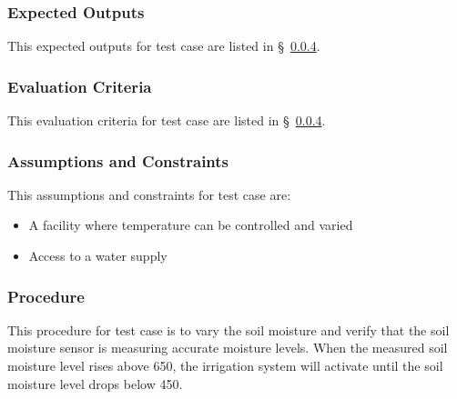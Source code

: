 \subsubsection{Expected Outputs}
\label{loc:TestCaseExpectedOutputs\StsTestSpecID\StsTestCaseID}
% 

This expected outputs for test  case  are listed in \S~\ref{loc:TestCaseProcedure\StsTestSpecID\StsTestCaseID}.

\subsubsection{Evaluation Criteria}
\label{loc:TestCaseEvaluationCriteria\StsTestSpecID\StsTestCaseID}
% 

This evaluation criteria for test  case  are listed in \S~\ref{loc:TestCaseProcedure\StsTestSpecID\StsTestCaseID}.

\subsubsection{Assumptions and Constraints}
\label{loc:TestCaseAssumptions\StsTestSpecID\StsTestCaseID}
% 

This assumptions and constraints for test  case  are:

\begin{itemize}
    \item A facility where temperature can be controlled and varied
    \item Access to a water supply
\end{itemize}

\subsubsection{Procedure}
\label{loc:TestCaseProcedure\StsTestSpecID\StsTestCaseID}
% 

This procedure for test  case  is to vary the soil moisture and verify that the soil moisture sensor is measuring accurate moisture levels.
When the measured soil moisture level rises above 650, the irrigation system will activate until the soil moisture level drops below 450.

